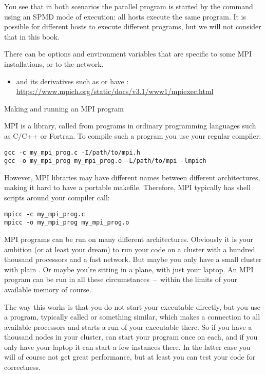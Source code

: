 You see that in both scenarios the parallel program is started
by the  command using
an \ac{SPMD} mode of execution: all hosts execute the same program.
It is possible for different hosts to execute different programs,
but we will not consider that in this book.

There can be options and environment variables that are specific to
some MPI installations, or to the network.
\begin{itemize}
\item {} and its derivatives such as
   or  have
  :
  \url{https://www.mpich.org/static/docs/v3.1/www1/mpiexec.html}
\end{itemize}

 {Making and running an MPI program}

MPI is a library, called from programs in ordinary programming languages
such as C/C++ or Fortran. To compile such a program you use your regular
compiler:
\begin{verbatim}
gcc -c my_mpi_prog.c -I/path/to/mpi.h
gcc -o my_mpi_prog my_mpi_prog.o -L/path/to/mpi -lmpich
\end{verbatim}
However, MPI libraries may have different names between different
architectures, making it hard to have a portable makefile. Therefore,
MPI typically has shell scripts around your compiler call:
\begin{verbatim}
mpicc -c my_mpi_prog.c
mpicc -o my_mpi_prog my_mpi_prog.o
\end{verbatim}

MPI programs can be run on many different architectures. Obviously it
is your ambition (or at least your dream) to run your code on a
cluster with a hundred thousand processors and a fast network. But
maybe you only have a small cluster with
plain . Or maybe you're sitting in a plane, with
just your laptop. An MPI program can be run in all these
circumstances~--~within the limits of your available memory of course.

The way this works is that you do not start your executable directly,
but you use a program, typically called  or
something similar, which makes a connection to all available
processors and starts a run of your executable there. So if you have a
thousand nodes in your cluster,  can start your program once
on each, and if you only have your laptop it can start a few instances
there. In the latter case you will of course not get great
performance, but at least you can test your code for correctness.

